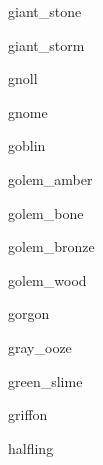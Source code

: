 \documentclass[letterpaper,serif]{module}
\begin{document}
\begin{newmonster}{giant_stone}\end{newmonster}

\begin{newmonster}{giant_storm}\end{newmonster}

\begin{newmonster}{gnoll}\end{newmonster}

\begin{newmonster}{gnome}\end{newmonster}

\begin{newmonster}{goblin}\end{newmonster}

\begin{newmonster}{golem_amber}\end{newmonster}

\begin{newmonster}{golem_bone}\end{newmonster}

\begin{newmonster}{golem_bronze}\end{newmonster}

\begin{newmonster}{golem_wood}\end{newmonster}

\begin{newmonster}{gorgon}\end{newmonster}

\begin{newmonster}{gray_ooze}\end{newmonster}

\begin{newmonster}{green_slime}\end{newmonster}

\begin{newmonster}{griffon}\end{newmonster}

\begin{newmonster}{halfling}\end{newmonster}
\end{document}
